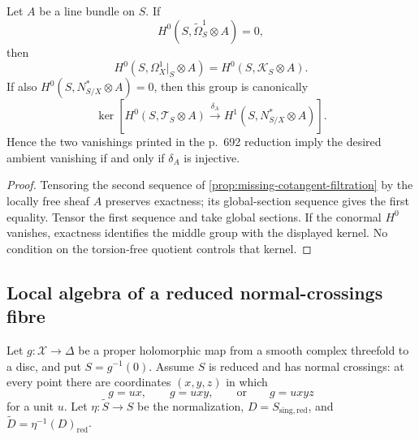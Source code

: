 \begin{proposition}
\label{prop:missing-global-section-criterion}
Let $A$ be a line bundle on $S$.  If
\[
H^0(S,\widetilde\Omega_S^1\otimes A)=0,
\]
then
\[
H^0(S,\Omega_X^1|_S\otimes A)
=H^0(S,\mathscr K_S\otimes A).
\]
If also $H^0(S,N^*_{S/X}\otimes A)=0$, then this group is canonically
\[
\ker\!\left[
H^0(S,\mathscr T_S\otimes A)
\xrightarrow{\delta_A}H^1(S,N^*_{S/X}\otimes A)
\right].
\]
Hence the two vanishings printed in the p.~692 reduction imply the desired
ambient vanishing if and only if $\delta_A$ is injective.
\end{proposition}

\begin{proof}
Tensoring the second sequence of
\cref{prop:missing-cotangent-filtration} by the locally free sheaf $A$
preserves exactness; its global-section sequence gives the first equality.
Tensor the first sequence and take global sections.  If the conormal
$H^0$ vanishes, exactness identifies the middle group with the displayed
kernel.  No condition on the torsion-free quotient controls that kernel.
\end{proof}

\subsection{Local algebra of a reduced normal-crossings fibre}

Let $g:\mathcal X\to\Delta$ be a proper holomorphic map from a smooth complex
threefold to a disc, and put $S=g^{-1}(0)$.  Assume $S$ is reduced and has
normal crossings: at every point there are coordinates $(x,y,z)$ in which
\[
g=ux,\qquad g=uxy,\qquad\text{or}\qquad g=uxyz
\tag{5.3}
\]
for a unit $u$.  Let $\eta:\widetilde S\to S$ be the normalization,
$D=S_{\mathrm{sing,red}}$, and $\widetilde D=\eta^{-1}(D)_{\mathrm{red}}$.

